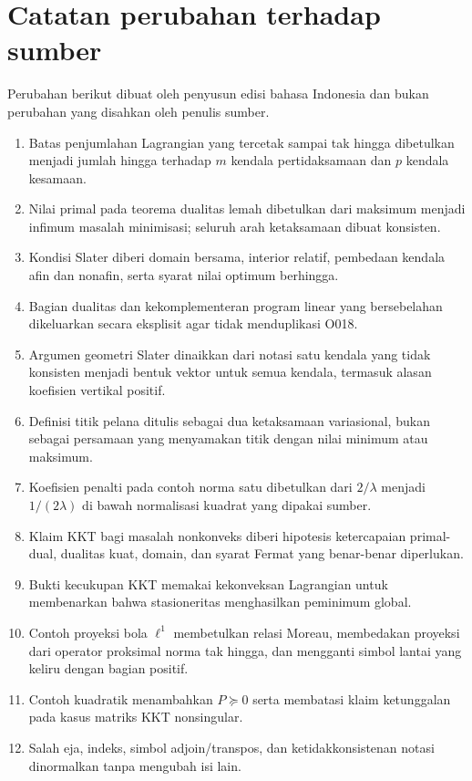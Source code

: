 \documentclass[indonesian]{shinybook}
\begin{document}
\tableofcontents
\mainmatter


\backmatter
\chapter*{Catatan perubahan terhadap sumber}
Perubahan berikut dibuat oleh penyusun edisi bahasa Indonesia dan bukan
perubahan yang disahkan oleh penulis sumber.
\begingroup\small
\begin{enumerate}
  \setlength{\itemsep}{0.15em}
  \setlength{\parskip}{0pt}
  \item Batas penjumlahan Lagrangian yang tercetak sampai tak hingga dibetulkan menjadi jumlah hingga terhadap $m$ kendala pertidaksamaan dan $p$ kendala kesamaan.
  \item Nilai primal pada teorema dualitas lemah dibetulkan dari maksimum menjadi infimum masalah minimisasi; seluruh arah ketaksamaan dibuat konsisten.
  \item Kondisi Slater diberi domain bersama, interior relatif, pembedaan kendala afin dan nonafin, serta syarat nilai optimum berhingga.
  \item Bagian dualitas dan kekomplementeran program linear yang bersebelahan dikeluarkan secara eksplisit agar tidak menduplikasi O018.
  \item Argumen geometri Slater dinaikkan dari notasi satu kendala yang tidak konsisten menjadi bentuk vektor untuk semua kendala, termasuk alasan koefisien vertikal positif.
  \item Definisi titik pelana ditulis sebagai dua ketaksamaan variasional, bukan sebagai persamaan yang menyamakan titik dengan nilai minimum atau maksimum.
  \item Koefisien penalti pada contoh norma satu dibetulkan dari $2/\lambda$ menjadi $1/(2\lambda)$ di bawah normalisasi kuadrat yang dipakai sumber.
  \item Klaim KKT bagi masalah nonkonveks diberi hipotesis ketercapaian primal-dual, dualitas kuat, domain, dan syarat Fermat yang benar-benar diperlukan.
  \item Bukti kecukupan KKT memakai kekonveksan Lagrangian untuk membenarkan bahwa stasioneritas menghasilkan peminimum global.
  \item Contoh proyeksi bola $\ell^1$ membetulkan relasi Moreau, membedakan proyeksi dari operator proksimal norma tak hingga, dan mengganti simbol lantai yang keliru dengan bagian positif.
  \item Contoh kuadratik menambahkan $P\succeq0$ serta membatasi klaim ketunggalan pada kasus matriks KKT nonsingular.
  \item Salah eja, indeks, simbol adjoin/transpos, dan ketidakkonsistenan notasi dinormalkan tanpa mengubah isi lain.
\end{enumerate}
\endgroup
\end{document}

